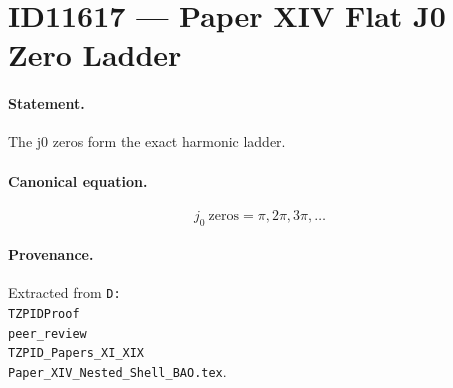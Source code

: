 \section*{ID11617 --- Paper XIV Flat J0 Zero Ladder}

\paragraph{Statement.}
The j0 zeros form the exact harmonic ladder.

\paragraph{Canonical equation.}
\[
j_0\ \mathrm{zeros}=\pi,2\pi,3\pi,\ldots
\]

\paragraph{Provenance.}
Extracted from \texttt{D:\\TZPIDProof\\peer\_review\\TZPID\_Papers\_XI\_XIX\\Paper\_XIV\_Nested\_Shell\_BAO.tex}.
